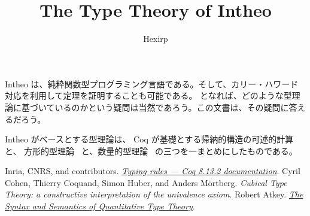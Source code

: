 \documentclass[book]{jlreq}
\title{The Type Theory of Intheo}
\author{Hexirp}
\begin{document}
\frontmatter

\maketitle

Intheo は、純粋関数型プログラミング言語である。そして、カリー・ハワード対応を利用して定理を証明することも可能である。
となれば、どのような型理論に基づいているのかという疑問は当然であろう。この文書は、その疑問に答えるだろう。

Intheo がベースとする型理論は、 Coq が基礎とする帰納的構造の可述的計算~\cite{cic} と、
方形的型理論~\cite{cutt} と、数量的型理論~\cite{qtt} の三つを一まとめにしたものである。

\tableofcontents

\mainmatter

\backmatter

\begin{thebibliography}{99}
    Inria, CNRS, and contributors.
    \href{https://coq.github.io/doc/v8.13/refman/language/cic.html}{\textit{Typing rules --- Coq 8.13.2 documentation}}.
    Cyril Cohen, Thierry Coquand, Simon Huber, and Anders Mörtberg.
    \textit{Cubical Type Theory: a constructive interpretation of the univalence axiom}.
    Robert Atkey.
    \href{https://bentnib.org/quantitative-type-theory.html}{\textit{The Syntax and Semantics of Quantitative Type Theory}}.
\end{thebibliography}

\printindex
\end{document}
